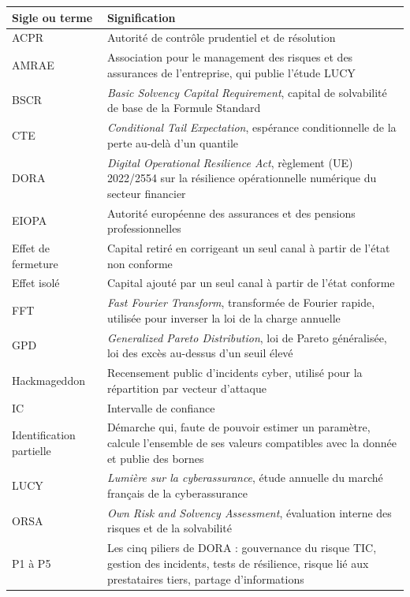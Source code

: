 \begin{center}\small
\renewcommand{\arraystretch}{1.15}
\begin{longtable}{@{}>{\raggedright\arraybackslash}p{2.6cm}>{\raggedright\arraybackslash}p{12.2cm}@{}}
\toprule
\textbf{Sigle ou terme} & \textbf{Signification} \\
\midrule
\endhead
ACPR & Autorité de contrôle prudentiel et de résolution \\
AMRAE & Association pour le management des risques et des assurances de l'entreprise, qui publie l'étude LUCY \\
BSCR & \emph{Basic Solvency Capital Requirement}, capital de solvabilité de base de la Formule Standard \\
CTE & \emph{Conditional Tail Expectation}, espérance conditionnelle de la perte au-delà d'un quantile \\
DORA & \emph{Digital Operational Resilience Act}, règlement (UE) 2022/2554 sur la résilience opérationnelle numérique du secteur financier \\
EIOPA & Autorité européenne des assurances et des pensions professionnelles \\
Effet de fermeture & Capital retiré en corrigeant un seul canal à partir de l'état non conforme \\
Effet isolé & Capital ajouté par un seul canal à partir de l'état conforme \\
FFT & \emph{Fast Fourier Transform}, transformée de Fourier rapide, utilisée pour inverser la loi de la charge annuelle \\
GPD & \emph{Generalized Pareto Distribution}, loi de Pareto généralisée, loi des excès au-dessus d'un seuil élevé \\
Hackmageddon & Recensement public d'incidents cyber, utilisé pour la répartition par vecteur d'attaque \\
IC & Intervalle de confiance \\
Identification partielle & Démarche qui, faute de pouvoir estimer un paramètre, calcule l'ensemble de ses valeurs compatibles avec la donnée et publie des bornes \\
LUCY & \emph{Lumière sur la cyberassurance}, étude annuelle du marché français de la cyberassurance \\
ORSA & \emph{Own Risk and Solvency Assessment}, évaluation interne des risques et de la solvabilité \\
P1 à P5 & Les cinq piliers de DORA : gouvernance du risque TIC, gestion des incidents, tests de résilience, risque lié aux prestataires tiers, partage d'informations \\

\end{longtable}
\end{center}
